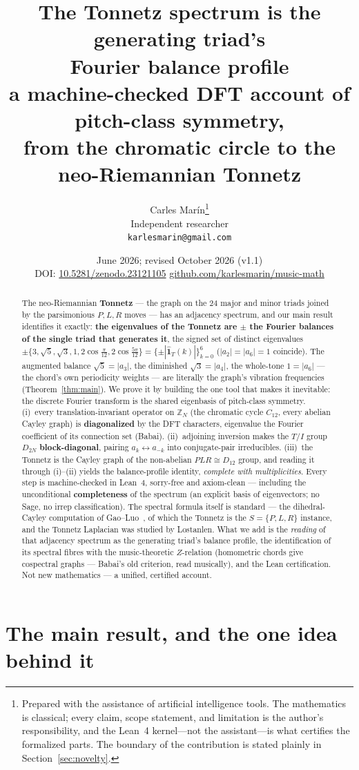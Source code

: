 \documentclass[11pt]{article}
\title{\bf The Tonnetz spectrum is the generating triad's\\ Fourier balance profile\\[5pt]
\large\rm a machine-checked DFT account of pitch-class symmetry,\\ from the chromatic circle to the neo-Riemannian Tonnetz}
\author{Carles Mar\'in\thanks{Prepared with the assistance of artificial intelligence tools.
The mathematics is classical; every claim, scope statement, and limitation is the author's
responsibility, and the Lean~4 kernel---not the assistant---is what certifies the formalized parts.
The boundary of the contribution is stated plainly in Section~\ref{sec:novelty}.}\\[3pt]
  \normalsize Independent researcher\\
  \normalsize \texttt{karlesmarin@gmail.com}}
\date{June 2026; revised October 2026 (v1.1)\\[3pt]\normalsize DOI: \href{https://doi.org/10.5281/zenodo.23121105}{10.5281/zenodo.23121105}
\quad\textbullet\quad \href{https://github.com/karlesmarin/music-math}{github.com/karlesmarin/music-math}}
\newcommand{\Zn}[1]{\mathbb{Z}_{#1}}
\begin{document}
\maketitle

\begin{abstract}\noindent
The neo-Riemannian \textbf{Tonnetz} --- the graph on the $24$ major and minor triads joined by the
parsimonious $P,L,R$ moves --- has an adjacency spectrum, and our main result identifies it exactly:
\textbf{the eigenvalues of the Tonnetz are $\pm$ the Fourier balances of the single triad that generates
it}, the signed set of distinct eigenvalues $\pm\{3,\sqrt5,\sqrt3,1,2\cos\frac{\pi}{12},2\cos\frac{5\pi}{12}\}
=\{\pm|\hat{\mathbf 1}_T(k)|\}_{k=0}^{6}$ ($|a_2|=|a_6|=1$ coincide). The augmented balance $\sqrt5=|a_3|$, the diminished
$\sqrt3=|a_4|$, the whole-tone $1=|a_6|$ --- the chord's own periodicity weights --- are literally the
graph's vibration frequencies (Theorem~\ref{thm:main}). We prove it by building the one tool that makes it
inevitable: the discrete Fourier transform is the shared eigenbasis of pitch-class symmetry.
(i)~every translation-invariant operator on $\Zn{N}$ (the chromatic cycle $C_{12}$, every abelian Cayley
graph) is \textbf{diagonalized} by the DFT characters, eigenvalue the Fourier coefficient of its connection
set (Babai). (ii)~adjoining inversion makes the $T/I$ group $D_{2N}$ \textbf{block-diagonal}, pairing
$a_k\leftrightarrow a_{-k}$ into conjugate-pair irreducibles. (iii)~the Tonnetz is the Cayley graph of the
non-abelian $PLR\cong D_{12}$ group, and reading it through (i)--(ii) yields the balance-profile identity,
\emph{complete with multiplicities}. Every step is machine-checked in Lean~4, sorry-free and axiom-clean ---
including the unconditional \textbf{completeness} of the spectrum (an explicit basis of eigenvectors; no
Sage, no irrep classification). The spectral formula itself is standard --- the dihedral-Cayley computation
of Gao--Luo~\cite{GaoLuo}, of which the Tonnetz is the $S=\{P,L,R\}$ instance, and the Tonnetz Laplacian was
studied by Lostanlen. What we add is the \emph{reading} of that adjacency spectrum as the generating triad's
balance profile, the identification of its spectral fibres with the music-theoretic $Z$-relation (homometric
chords give cospectral graphs --- Babai's old criterion, read musically), and the Lean certification. Not new
mathematics --- a unified, certified account.
\end{abstract}

\section{The main result, and the one idea behind it}\label{sec:hook}
\end{document}

